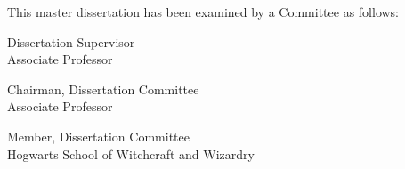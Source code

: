 \begin{titlepage}
\begin{large}
This master dissertation has been examined by a Committee as follows:

\signature{Professor Silvio de Barros Melo}{Dissertation Supervisor \\
   Associate Professor}

\signature{Professor Veronica Teichrieb}{Chairman, Dissertation Committee \\
   Associate Professor}

\signature{Professor Alvo Dumbledore}{Member, Dissertation Committee \\
   Hogwarts School of Witchcraft and Wizardry}
\end{large}
\end{titlepage}

